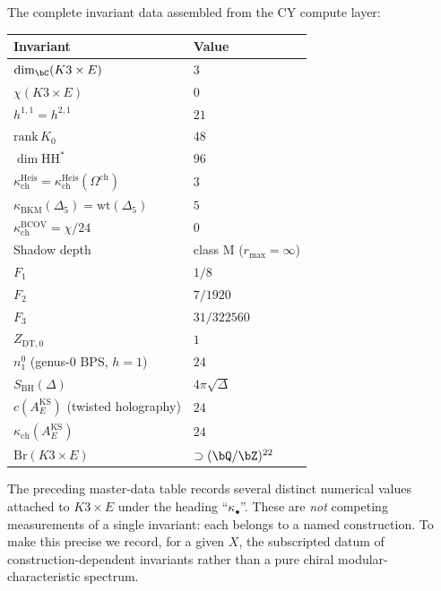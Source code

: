 \begin{remark}
\label{rem:master-data-k3xe}
The complete invariant data assembled from the CY compute
layer:
\begin{center}
\small
\renewcommand{\arraystretch}{1.3}
\begin{tabular}{ll}
\textbf{Invariant} & \textbf{Value} \\
\hline
$\dim_\bC(K3 \times E)$ & $3$ \\
$\chi(K3 \times E)$ & $0$ \\
$h^{1,1} = h^{2,1}$ & $21$ \\
$\mathrm{rank}\,K_0$ & $48$ \\
$\dim \mathrm{HH}^*$ & $96$ \\
$\kappa_{\mathrm{ch}}^{\mathrm{Heis}} = \kappa_{\mathrm{ch}}^{\mathrm{Heis}}(\Omega^{\mathrm{ch}})$ & $3$ \\
$\kappa_{\mathrm{BKM}}(\Delta_5) = \mathrm{wt}(\Delta_5)$ & $5$ \\
$\kappa_{\mathrm{ch}}^{\mathrm{BCOV}}=\chi/24$ & $0$ \\
Shadow depth & class M ($r_{\max} = \infty$) \\
$F_1$ & $1/8$ \\
$F_2$ & $7/1920$ \\
$F_3$ & $31/322560$ \\
$Z_{\mathrm{DT},0}$ & $1$ \\
$n^0_1$ (genus-$0$ BPS, $h = 1$) & $24$ \\
$S_{\mathrm{BH}}(\Delta)$ & $4\pi\sqrt{\Delta}$ \\
$c(A_E^{\mathrm{KS}})$ (twisted holography) & $24$ \\
$\kappa_{\mathrm{ch}}(A_E^{\mathrm{KS}})$ & $24$ \\
$\mathrm{Br}(K3 \times E)$ & $\supset (\bQ/\bZ)^{22}$
\end{tabular}
\end{center}
\end{remark}

The preceding master-data table records several distinct numerical
values attached to $K3 \times E$ under the heading
``$\kappa_\bullet$''. These are \emph{not} competing measurements of
a single invariant: each belongs to a named construction. To make
this precise we record, for a given $X$, the subscripted datum of
construction-dependent invariants rather than a pure chiral
modular-characteristic spectrum.

